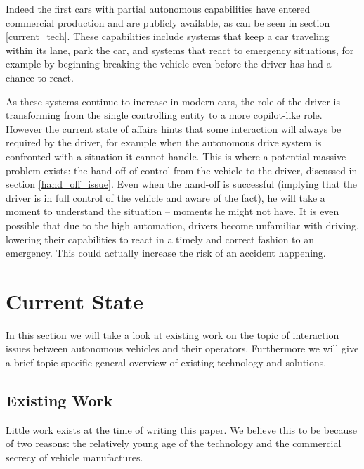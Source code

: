 \documentclass{acm_proc_article-sp}
\begin{document}
Indeed the first cars with partial autonomous capabilities have entered commercial production and are publicly available, as can be seen in section \ref{current_tech}.
These capabilities include systems that keep a car traveling within its lane, park the car, and systems that react to emergency situations, for example by beginning breaking the vehicle even before the driver has had a chance to react.

As these systems continue to increase in modern cars, the role of the driver is transforming from the single controlling entity to a more copilot-like role.
However the current state of affairs hints that some interaction will always be required by the driver, for example when the autonomous drive system is confronted with a situation it cannot handle.
This is where a potential massive problem exists: the hand-off of control from the vehicle to the driver, discussed in section \ref{hand_off_issue}.
Even when the hand-off is successful (implying that the driver is in full control of the vehicle and aware of the fact), he will take a moment to understand the situation – moments he might not have.
It is even possible that due to the high automation, drivers become unfamiliar with driving, lowering their capabilities to react in a timely and correct fashion to an emergency.
This could actually increase the risk of an accident happening.


\section{Current State}

In this section we will take a look at existing work on the topic of interaction issues between autonomous vehicles and their operators.
Furthermore we will give a brief topic-specific general overview of existing technology and solutions.

\subsection{Existing Work}

Little work exists at the time of writing this paper.
We believe this to be because of two reasons: the relatively young age of the technology and the commercial secrecy of vehicle manufactures.
\end{document}
